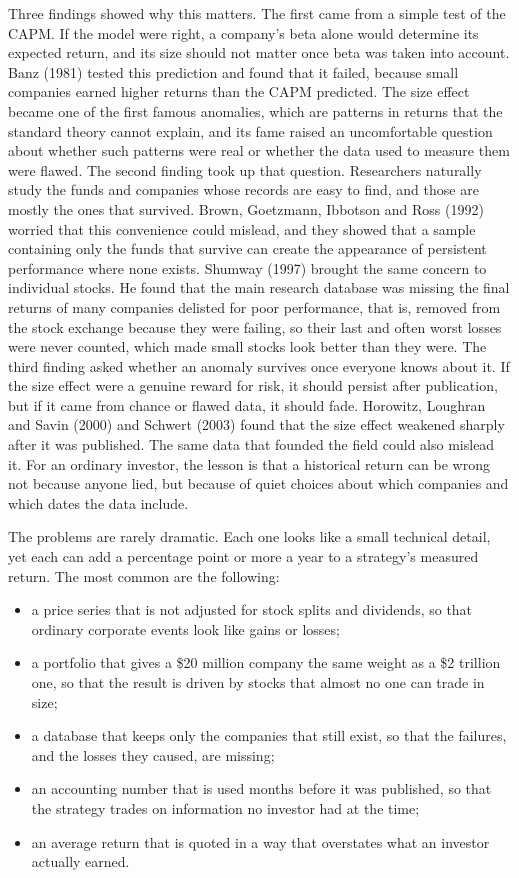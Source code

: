 Three findings showed why this matters. The first came from a simple test of the CAPM. If the model were right, a company's beta alone would determine its expected return, and its size should not matter once beta was taken into account. Banz (1981) tested this prediction and found that it failed, because small companies earned higher returns than the CAPM predicted. The size effect became one of the first famous anomalies, which are patterns in returns that the standard theory cannot explain, and its fame raised an uncomfortable question about whether such patterns were real or whether the data used to measure them were flawed. The second finding took up that question. Researchers naturally study the funds and companies whose records are easy to find, and those are mostly the ones that survived. Brown, Goetzmann, Ibbotson and Ross (1992) worried that this convenience could mislead, and they showed that a sample containing only the funds that survive can create the appearance of persistent performance where none exists. Shumway (1997) brought the same concern to individual stocks. He found that the main research database was missing the final returns of many companies delisted for poor performance, that is, removed from the stock exchange because they were failing, so their last and often worst losses were never counted, which made small stocks look better than they were. The third finding asked whether an anomaly survives once everyone knows about it. If the size effect were a genuine reward for risk, it should persist after publication, but if it came from chance or flawed data, it should fade. Horowitz, Loughran and Savin (2000) and Schwert (2003) found that the size effect weakened sharply after it was published. The same data that founded the field could also mislead it. For an ordinary investor, the lesson is that a historical return can be wrong not because anyone lied, but because of quiet choices about which companies and which dates the data include.

The problems are rarely dramatic. Each one looks like a small technical detail, yet each can add a percentage point or more a year to a strategy's measured return. The most common are the following:

\begin{itemize}
  \item a price series that is not adjusted for stock splits and dividends, so that ordinary corporate events look like gains or losses;
  \item a portfolio that gives a \$20 million company the same weight as a \$2 trillion one, so that the result is driven by stocks that almost no one can trade in size;
  \item a database that keeps only the companies that still exist, so that the failures, and the losses they caused, are missing;
  \item an accounting number that is used months before it was published, so that the strategy trades on information no investor had at the time;
  \item an average return that is quoted in a way that overstates what an investor actually earned.
\end{itemize}

